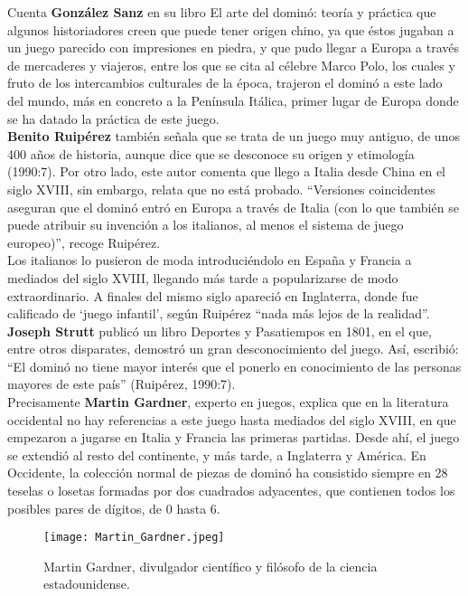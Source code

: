 Cuenta \textbf{González Sanz} en su libro El arte del dominó: teoría y práctica \cite{sanz00} que algunos historiadores
creen que puede tener origen chino, ya que éstos jugaban a un juego parecido con impresiones en piedra,
y que pudo llegar a Europa a través de mercaderes y viajeros, entre los que se cita al célebre
Marco Polo, los cuales y fruto de los intercambios culturales de la época, trajeron el dominó a este
lado del mundo, más en concreto a la Península Itálica, primer lugar de Europa donde se ha datado la
práctica de este juego. \\

\textbf{Benito Ruipérez} \cite{mora90} también señala que se trata de un juego muy antiguo, de unos 400 años de historia,
aunque dice que se desconoce su origen y etimología (1990:7). Por otro lado, este autor comenta que
llego a Italia desde China en el siglo XVIII, sin embargo, relata que no está probado. “Versiones
coincidentes aseguran que el dominó entró en Europa a través de Italia (con lo que también se puede
atribuir su invención a los italianos, al menos el sistema de juego europeo)”, recoge Ruipérez. \\

Los italianos lo pusieron de moda introduciéndolo en España y Francia a mediados del siglo XVIII,
llegando más tarde a popularizarse de modo extraordinario. A finales del mismo siglo apareció en
Inglaterra, donde fue calificado de ‘juego infantil’, según Ruipérez “nada más lejos de la realidad”.
\textbf{Joseph Strutt} publicó un libro Deportes y Pasatiempos en 1801, en el que, entre otros disparates,
demostró un gran desconocimiento del juego. Así, escribió: “El dominó no tiene mayor interés que
el ponerlo en conocimiento de las personas mayores de este país” (Ruipérez, 1990:7). \\

Precisamente \textbf{Martin Gardner}, experto en juegos, explica que en la literatura occidental no hay
referencias a este juego hasta mediados del siglo XVIII, en que empezaron a jugarse en Italia y
Francia las primeras partidas. Desde ahí, el juego se extendió al resto del continente, y más tarde,
a Inglaterra y América. En Occidente, la colección normal de piezas de dominó ha consistido siempre
en 28 teselas o losetas formadas por dos cuadrados adyacentes, que contienen todos los posibles
pares de dígitos, de 0 hasta 6. \\

\begin{figure}[h]
  \label{Martin_Gardner}
  \begin{center}
    \texttt{[image: Martin\_Gardner.jpeg]}
  \end{center}
  \caption{Martin Gardner, divulgador científico y filósofo de la ciencia estadounidense.}
\end{figure}


